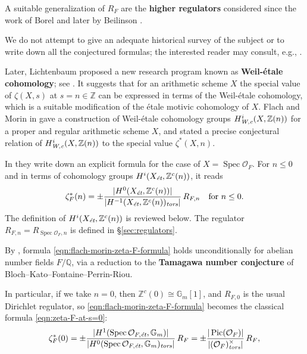 \documentclass[draft]{article}
\DeclareMathOperator{\Pic}{Pic}
\DeclareMathOperator{\Spec}{Spec}
\newcommand{\QQ}{\mathbb{Q}}
\newcommand{\ZZ}{\mathbb{Z}}
\newcommand{\et}{\text{\it \'{e}t}}
\newcommand{\tors}{\text{\it tors}}
\newcommand{\Wc}{\text{\it W,c}}
\theoremstyle{myplain}
\theoremstyle{mydefinition}
\begin{document}
A suitable generalization of $R_F$ are the \textbf{higher regulators} considered
since the work of Borel \cite{Borel-1977} and later by Beilinson
\cite{Beilinson-1984}.

We do not attempt to give an adequate historical survey of the subject or to
write down all the conjectured formulas; the interested reader may consult,
e.g., \cite{Kolster-2004,Goncharov-2005,Kahn-2005}.

\vspace{1em}

Later, Lichtenbaum proposed a new research program known as
\textbf{Weil-\'{e}tale cohomology}; see
\cite{Lichtenbaum-2005,Lichtenbaum-2009-Euler-char,Lichtenbaum-2009-number-rings,Lichtenbaum-2021}.
It suggests that for an arithmetic scheme $X$ the special value of $\zeta (X,s)$
at $s = n \in \ZZ$ can be expressed in terms of the Weil-\'{e}tale cohomology,
which is a suitable modification of the \'{e}tale motivic cohomology of $X$.
Flach and Morin in \cite{Flach-Morin-2018} gave a construction of Weil-\'{e}tale
cohomology groups $H^i_\Wc (X,\ZZ(n))$ for a proper and regular arithmetic
scheme $X$, and stated a precise conjectural relation of $H^i_\Wc (X,\ZZ(n))$ to
the special value $\zeta^* (X,n)$.

In \cite[\S 5.8.3]{Flach-Morin-2018} they write down an explicit formula for the
case of $X = \Spec \mathcal{O}_F$. For $n \le 0$ and in terms of cohomology
groups $H^i (X_\et, \ZZ^c (n))$, it reads
\begin{equation}
  \label{eqn:flach-morin-zeta-F-formula}
  \zeta_F^* (n) = \pm\frac{|H^0 (X_\et, \ZZ^c (n))|}{|H^{-1} (X_\et, \ZZ^c (n))_\tors|}\,R_{F,n}
  \quad \text{for }n \le 0.
\end{equation}
The definition of $H^i (X_\et, \ZZ^c (n))$ is reviewed below.
The regulator $R_{F,n} = R_{\Spec \mathcal{O}_F,n}$ is defined in
\S\ref{sec:regulators}.

By \cite[Proposition~5.35]{Flach-Morin-2018}, formula
\eqref{eqn:flach-morin-zeta-F-formula} holds unconditionally for abelian number
fields $F/\QQ$, via a reduction to the \textbf{Tamagawa number conjecture} of
Bloch--Kato--Fontaine--Perrin-Riou.

In particular, if we take $n = 0$, then $\ZZ^c (0) \cong \mathbb{G}_m [1]$, and
$R_{F,0}$ is the usual Dirichlet regulator, so
\eqref{eqn:flach-morin-zeta-F-formula} becomes the classical formula
\eqref{eqn:zeta-F-at-s=0}:
\[ \zeta_F^* (0) =
  \pm \frac{|H^1 (\Spec \mathcal{O}_{F,\et}, \mathbb{G}_m)|}{|H^0 (\Spec \mathcal{O}_{F,\et}, \mathbb{G}_m)_\tors|}\,R_F =
  \pm \frac{|\Pic (\mathcal{O}_F)|}{|(\mathcal{O}_F)^\times_\tors|}\,R_F, \]
\end{document}
